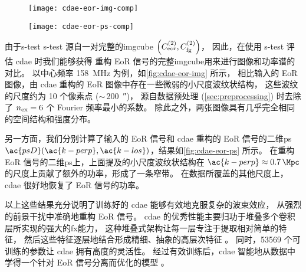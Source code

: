 \begin{figure}[htp]
  \centering
  \texttt{[image: cdae-eor-img-comp]}
  \label{fig:cdae-eor-img}
\end{figure}

\begin{figure}[htp]
  \centering
  \texttt{[image: cdae-eor-ps-comp]}
  \label{fig:cdae-eor-ps}
\end{figure}

由于\acl{s-test} \ac{s-test} 源自一对完整的\ac{imgcube}
$\left( C_{\mathrm{eor}}^{(2)}, C_{\mathrm{fg}}^{(2)} \right)$，
因此，在使用 \ac{s-test} 评估 \ac{cdae} 时我们能够获得
重构 EoR 信号的完整\ac{imgcube}用来进行图像和功率谱的对比。
以中心频率 \SI{158}{\MHz} 为例，如\autoref{fig:cdae-eor-img} 所示，
相比输入的 EoR 图像，由 \ac{cdae} 重构的 EoR 图像中存在一些微弱的小尺度波纹状结构，
这些波纹的尺度约为 10 个像素点 ($\sim$\,\SI{200}{\arcsecond})，
源自数据预处理 (\autoref{sec:preprocessing}) 时去除了 $n_{\mathrm{ex}} = 6$
个 Fourier 频率最小的系数。
除此之外，两张图像具有几乎完全相同的空间结构和强度分布。

另一方面，我们分别计算了输入的 EoR 信号和 \ac{cdae} 重构的 EoR 信号的二维\ac{ps}
$\ac{psD}(\ac{k-perp}, \ac{k-los})$，结果如\autoref{fig:cdae-eor-ps} 所示。
在重构 EoR 信号的二维\ac{ps}上，上面提及的小尺度波纹状结构在
$\ac{k-perp} \approx \SI{0.7}{\per\Mpc}$ 的尺度上贡献了额外的功率，形成了一条窄带。
在数据所覆盖的其他尺度上，\ac{cdae} 很好地恢复了 EoR 信号的功率。

以上这些结果充分说明了训练好的 \ac{cdae} 能够有效地克服复杂的波束效应，
从强烈的前景干扰中准确地重构 EoR 信号。
\ac{cdae} 的优秀性能主要归功于堆叠多个卷积层所实现的强大的\ac{fx}能力，
这种堆叠式架构让每一层专注于提取相对简单的特征，
然后这些特征逐层地结合形成精细、抽象的高层次特征 \cite{leCun2015}。
同时，\num{53569} 个可训练的参数让 \ac{cdae} 拥有高度的灵活性。
经过有效训练后，\ac{cdae} 智能地从数据中学得一个针对 EoR 信号分离而优化的模型
\cite{domingos2012}。

